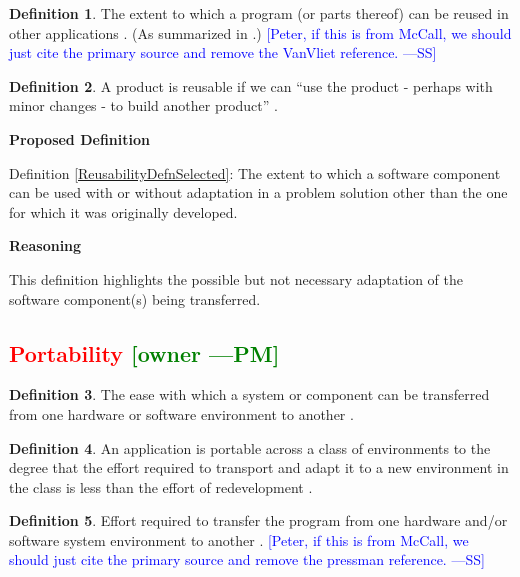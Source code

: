 \documentclass[letterpaper,cleveref]{lipics-v2019}
\newcommand{\authornote}[3]{\textcolor{#1}{[#3 ---#2]}}
\newcommand{\authornote}[3]{}
\newcommand{\wss}[1]{\authornote{blue}{SS}{#1}} %
\newcommand{\pmi}[1]{\authornote{green}{PM}{#1}} %
\newcommand{\notdone}[1]{\textcolor{red}{#1}}
\theoremstyle{definition}
\newtheorem{defn}{Definition}
\begin{document}
\begin{defn}
  The extent to which a program (or parts thereof) can be reused in other
  applications \citep{McCallEtAl1977}. (As summarized in \citet{VanVliet2000}.)
  \wss{Peter, if this is from McCall, we should just cite the primary source and
    remove the VanVliet reference.}
\end{defn}

\begin{defn}
  A product is reusable if we can ``use the product - perhaps with minor changes
  - to build another product'' \citep{ghezzi1991fundamentals}.
\end{defn}

\noindent \textbf{Proposed Definition}

Definition \ref{ReusabilityDefnSelected}: The extent to which a software
component can be used with or without adaptation in a problem solution other
than the one for which it was originally developed.

\noindent \textbf{Reasoning}

This definition highlights the possible but not necessary adaptation of the
software component(s) being transferred.

\subsection{\notdone{Portability} \pmi{owner}}

\begin{defn}
  The ease with which a system or component can be transferred from one hardware
  or software environment to another \citep{IEEEStdGlossarySET1990}.
\end{defn}

\begin{defn}
  An application is portable across a class of environments to the degree that
  the effort required to transport and adapt it to a new environment in the
  class is less than the effort of redevelopment \citep{mooney1990strategies}.
\end{defn}

\begin{defn} \label{PortabilityDefnSelected} Effort required to transfer the
  program from one hardware and/or software system environment to another
  \citep{pressman2005software}.  \wss{Peter, if this is from McCall, we should
    just cite the primary source and remove the pressman reference.}
\end{defn}
\end{document}

